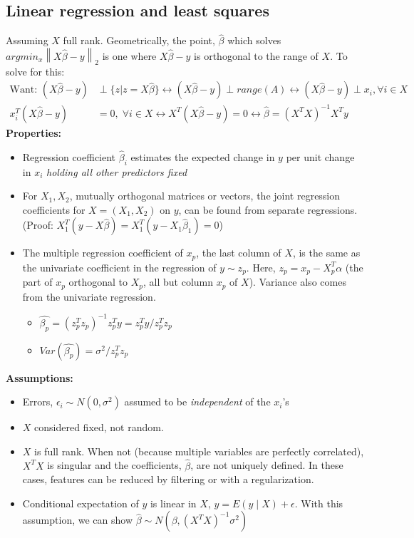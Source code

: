 \documentclass{article}
\newcommand{\norm}[2]{\left\lVert#1\right\rVert_#2}
\begin{document}
\subsection{Linear regression and least squares}
Assuming $X$ full rank. Geometrically, the point, $\hat{\beta}$ which solves $argmin_x\norm{X\hat{\beta} - y}{2}$ is one where $X\hat{\beta} - y$ is orthogonal to the range of $X$. To solve for this:
\begin{align*}
    \textrm{Want: } (X\hat{\beta} - y) &\perp \{z \vert z = X\hat{\beta}\} \longleftrightarrow (X\hat{\beta} - y) \perp range(A) \longleftrightarrow (X\hat{\beta} - y) \perp x_i, \forall i \in X\\
    x_i^T(X\hat{\beta} - y) &= 0, \; \forall i \in X \longleftrightarrow X^T(X\hat{\beta} - y) = 0 \longleftrightarrow \hat{\beta} = (X^TX)^{-1}X^Ty
\end{align*}
\textbf{Properties:}
\begin{itemize}
  \item Regression coefficient $\hat{\beta}_i$ estimates the expected change in $y$ per unit change in $x_i$ \textit{holding all other predictors fixed}
  \item For $X_1, X_2$, mutually orthogonal matrices or vectors, the joint regression coefficients for $X = (X_1, X_2)$ on $y$, can be found from separate regressions. (Proof: $X_1^T(y - X\hat{\beta}) = X_1^T(y - X_1\hat{\beta}_1) = 0$)
  \item The multiple regression coefficient of $x_p$, the last column of $X$, is the same as the univariate coefficient in the regression of $y \sim z_p$. Here, $z_p = x_p - X_p^T\alpha$ (the part of $x_p$ orthogonal to $X_p$, all but column $x_p$ of $X$). Variance also comes from the univariate regression.
  \begin{itemize}
    \item $\hat{\beta_p} = (z_p^Tz_p)^{-1}z_p^Ty = z_p^Ty / z_p^Tz_p$
    \item $Var(\hat{\beta_p}) = \sigma^2 / z_p^Tz_p$
  \end{itemize}
\end{itemize}
\textbf{Assumptions:}
\begin{itemize}
  \item Errors, $\epsilon_i \sim N(0, \sigma^2)$ assumed to be \textit{independent} of the $x_i$'s
  \item $X$ considered fixed, not random. 
  \item $X$ is full rank. When not (because multiple variables are perfectly correlated), $X^TX$ is singular and the coefficients, $\hat{\beta}$, are not uniquely defined. In these cases, features can be reduced by filtering or with a regularization.
  \item Conditional expectation of $y$ is linear in $X$, $y = E(y \mid X) + \epsilon$. With this assumption, we can show $\hat{\beta} \sim N(\beta, (X^TX)^{-1}\sigma^2)$
\end{itemize}
\end{document}
